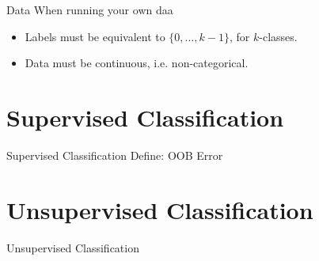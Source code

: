 \documentclass[xcolor=dvipsnames]{beamer}
\begin{document}
\begin{frame}{Data}
    When running your own daa
    \begin{itemize}
        \item Labels must be equivalent to $\{0, \dots, k-1\}$, for $k$-classes.
        \item Data must be continuous, i.e. non-categorical.
    \end{itemize}
\end{frame}


\section{Supervised Classification}
\begin{frame}{Supervised Classification}
Define: OOB Error
\end{frame}



\section{Unsupervised Classification}
\begin{frame}{Unsupervised Classification}

\end{frame}
\end{document}
